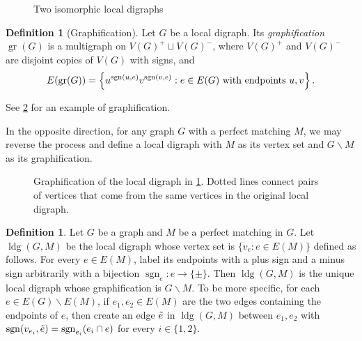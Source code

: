 \documentclass[reqno,11pt]{amsart}
\numberwithin{equation}{section}
\theoremstyle{definition}
\newtheorem{definition}[theorem]{Definition}
\theoremstyle{remark}
\DeclareMathOperator{\sgn}{sgn}
\DeclareMathOperator{\gr}{gr}
\DeclareMathOperator{\ldg}{ldg}
\begin{document}
\begin{center}
\begin{figure}[h]
        \caption{Two isomorphic local digraphs}
        \label{fig:iso-digraph}
    \end{figure}
    
\end{center}
\begin{definition}[Graphification]\label{def:graphification}
    Let $G$ be a local digraph.
    Its \emph{graphification} $\gr(G)$ is a multigraph on $V(G)^+\sqcup V(G)^-$, where $V(G)^+$ and $V(G)^-$ are disjoint copies of $V(G)$ with signs, and 
    \[E(\gr(G)) = \left\{u^{\textup{sgn}(u,e)}v^{\textup{sgn}(v,e)}: e\in E(G)\textup{ with endpoints }u,v \right\}.\]
\end{definition}
See \cref{fig:graphification} for an example of graphification.

In the opposite direction, for any graph $G$ with a perfect matching $M$, we may reverse the process and define a local digraph with $M$ as its vertex set and $G\backslash M$ as its graphification.

\begin{figure}[h]
    \begin{center}
    \end{center}
    \caption{Graphification of the local digraph in \cref{fig:iso-digraph}. Dotted lines connect pairs of vertices that come from the same vertices in the original local digraph.}
    \label{fig:graphification}
\end{figure}

\begin{definition}\label{def:corresp-local-digraph}
    Let $G$ be a graph and $M$ be a perfect matching in $G$.
    Let $\ldg(G,M)$ be the local digraph whose vertex set is $\{v_e:e\in E(M)\}$ defined as follows.
    For every $e\in E(M)$, label its endpoints with a plus sign and a minus sign arbitrarily with a bijection $\sgn_e\colon e\to \{\pm\}$.
    Then $\ldg(G,M)$ is the unique local digraph whose graphification is $G\backslash M$.
    To be more specific, for each $e\in E(G)\backslash E(M)$, if $e_1,e_2\in E(M)$ are the two edges containing the endpoints of $e$, then create an edge $\Tilde{e}$ in $\ldg(G,M)$ between $e_1,e_2$ with $\sgn(v_{e_i},\Tilde{e}) = \sgn_{e_i}(e_i\cap e)$ for every $i\in\{1,2\}$.
\end{definition}
\end{document}
